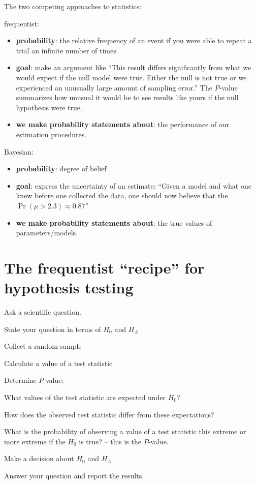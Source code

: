 \documentclass[landscape]{foils}
\begin{document}
\myNewSlide
The two competing approaches to statistics:
\begin{compactitem}
  \item frequentist:
  \begin{itemize}
    \item {\bf probability}: the relative frequency of an event if you were able to repeat a trial an infinite number of times.
    \item {\bf goal}: make an argument like ``This result differs significantly from what we would expect if the null model were true. Either the null is not true or we experienced an unusually large amount of sampling error.''
    The $P$-value summarizes how unusual it would be to see results like yours if the null hypothesis were true.
    \item {\bf we make probability statements about}: the performance of our estimation procedures.
  \end{itemize}
  \item Bayesian:
  \begin{itemize}
    \item {\bf probability}: degree of belief
    \item {\bf goal}: express the uncertainty of an estimate:
    ``Given a model and what one knew before one collected the data, one should now believe that the $\Pr(\mu>2.3)\approx 0.87$''
    \item {\bf we make probability statements about}: the true values of parameters/models.
  \end{itemize}
\end{compactitem}

\myNewSlide
\section*{The frequentist ``recipe'' for hypothesis testing}
\begin{compactenum}
  \item Ask a scientific question.
  \item State your question in terms of $H_0$ and $H_A$
  \item Collect a random sample
  \item Calculate a value of a test statistic
  \item Determine $P$-value:
  \begin{compactenum}
    \item What values of the test statistic are expected under $H_0$?
    \item How does the observed test statistic differ from these expectations?
    \item What is the probability of observing a value of a test statistic this extreme or more extreme if the $H_0$ is true? -- this is the $P$-value.
  \end{compactenum}
  \item Make a decision about $H_0$ and $H_A$
  \item Answer your question and report the results.
\end{compactenum}
\end{document}
